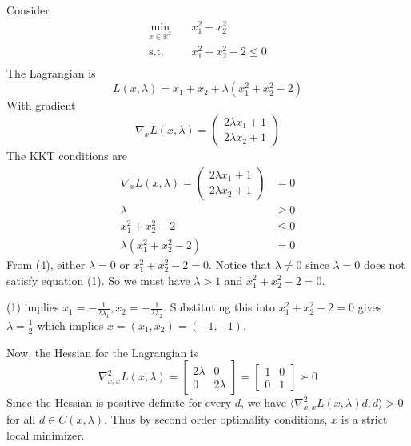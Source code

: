 \begin{example}
    Consider 
    \begin{align*}
        \min_{x \in \mathbb R^2} \quad &x_1^2 + x_2^2 \\
        \text{s.t.} \quad &x_1^2 + x_2^2 - 2\leq 0 \\
    \end{align*}
    The Lagrangian is $$L(x, \lambda) = x_1 + x_2 + \lambda(x_1^2 + x_2^2 - 2)$$
    With gradient
    $$\nabla_x L(x, \lambda) = \begin{pmatrix}
        2\lambda x_1 + 1 \\
        2\lambda x_2 + 1
    \end{pmatrix} $$
    The KKT conditions are 
    \begin{align*}
        \nabla_x L(x, \lambda) = \begin{pmatrix}
            2\lambda x_1 + 1 \\
            2\lambda x_2 + 1
        \end{pmatrix} &= 0 \tag{1}\\
        \lambda &\geq 0 \tag{2}\\
        x_1^2 + x_2^2 - 2 &\leq 0 \tag{3}\\
        \lambda(x_1^2 + x_2^2 - 2) &= 0 \tag{4}
    \end{align*}
    From (4), either $\lambda = 0$ or $x_1^2 + x_2^2 - 2 = 0$. Notice that $\lambda \neq 0$ since $\lambda = 0$ does not satisfy equation (1). So we must have $\lambda > 1$ and $x_1^2 + x_2^2 - 2 = 0$. 
    
    \bigskip 
    (1) implies $x_1 = - \frac{1}{2\lambda_1}, x_2 = - \frac{1}{2\lambda_2}$. Substituting this into $x_1^2 + x_2^2 - 2 = 0$ gives $\lambda = \frac{1}{2}$ which implies $x = (x_1,x_2) = (-1,-1)$. 

    \bigskip
    Now, the Hessian for the Lagrangian is $$\nabla^2_{x, x} L(x, \lambda) = \begin{bmatrix}
        2\lambda & 0 \\
        0 & 2\lambda
    \end{bmatrix} = \begin{bmatrix}
        1 & 0 \\
        0 & 1
    \end{bmatrix} \succ 0$$
    Since the Hessian is positive definite for every $d$, we have $\langle \nabla^2_{x, x} L(x, \lambda)d, d \rangle > 0$ for all $d \in C(x, \lambda)$. Thus by second order optimality conditions, $x$ is a strict local minimizer.
\end{example}

